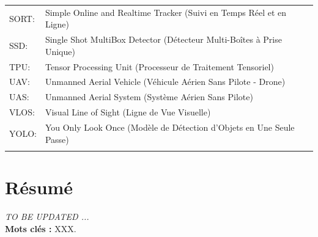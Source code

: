 \documentclass[12pt]{report}
\newcommand{\hlinecolor}{\arrayrulecolor{myColor}\hline\arrayrulecolor{black}}
\begin{document}
\begin{tabular}{p{} p{}}
\raggedright \textcolor{myColor}{SORT: } & Simple Online and Realtime Tracker (Suivi en Temps Réel et en Ligne) \\
\raggedright \textcolor{myColor}{SSD: } & Single Shot MultiBox Detector (Détecteur Multi-Boîtes à Prise Unique) \\
\raggedright \textcolor{myColor}{TPU: } & Tensor Processing Unit (Processeur de Traitement Tensoriel) \\
\raggedright \textcolor{myColor}{UAV: } & Unmanned Aerial Vehicle (Véhicule Aérien Sans Pilote - Drone) \\
\raggedright \textcolor{myColor}{UAS: } & Unmanned Aerial System (Système Aérien Sans Pilote) \\
\raggedright \textcolor{myColor}{VLOS: } & Visual Line of Sight (Ligne de Vue Visuelle) \\
\raggedright \textcolor{myColor}{YOLO: } & You Only Look Once (Modèle de Détection d'Objets en Une Seule Passe) \\

\hlinecolor
\end{tabular}





% 
%
%
%
\newpage
\section*{Résumé}
\textsl{\colorbox[rgb]{1,1,0}{TO BE UPDATED ...}}
\\
\textbf{Mots clés :} XXX.
\thispagestyle{plain}
\setcounter{page}{5}
\thispagestyle{fancy}
\newpage
\end{document}
